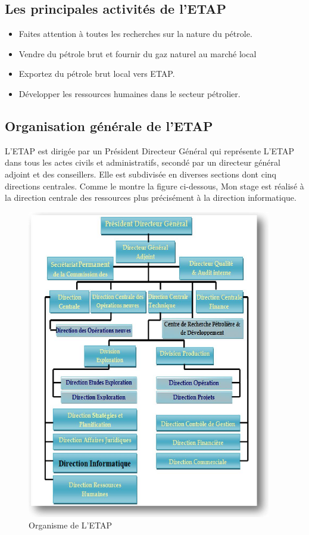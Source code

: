 \documentclass[12pt]{report}
\begin{document}
\subsection{Les principales activités de l'ETAP}
\begin{itemize}[label={$\bullet$}]
	\item Faites attention à toutes les recherches sur la nature du pétrole.
	\item Vendre du pétrole brut et fournir du gaz naturel au marché local
	\item Exportez du pétrole brut local vers ETAP.
	\item Développer les ressources humaines dans le secteur pétrolier.

\end{itemize}
\subsection{Organisation générale de l'ETAP}
L'ETAP est dirigée par un Président Directeur Général qui représente L'ETAP dans tous les actes civils et administratifs, secondé par un directeur général adjoint et des conseillers. Elle est subdivisée en diverses sections dont cinq directions centrales.
Comme le montre la figure ci-dessous, Mon stage  est réalisé à la direction centrale des ressources plus précisément à la direction informatique.
\begin{figure}[H]
  \centering
  \includegraphics[scale=1]{direction}
  \caption{Organisme de L'ETAP}
  \label{fig:votre-label}
\end{figure}
\end{document}

